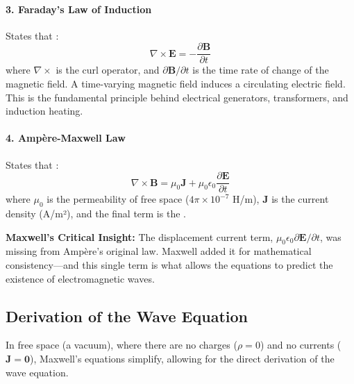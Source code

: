 \paragraph{3. Faraday's Law of Induction}
States that :
\begin{equation}
    \nabla \times \mathbf{E} = -\frac{\partial \mathbf{B}}{\partial t}
    \label{eq:faraday}
\end{equation}
where $\nabla \times$ is the curl operator, and $\partial \mathbf{B}/\partial t$ is the time rate of change of the magnetic field.
 A time-varying magnetic field induces a circulating electric field. This is the fundamental principle behind electrical generators, transformers, and induction heating.

\paragraph{4. Ampère-Maxwell Law}
States that :
\begin{equation}
    \nabla \times \mathbf{B} = \mu_0 \mathbf{J} + \mu_0 \epsilon_0 \frac{\partial \mathbf{E}}{\partial t}
    \label{eq:ampere-maxwell}
\end{equation}
where $\mu_0$ is the permeability of free space ($4\pi \times 10^{-7}$ H/m), $\mathbf{J}$ is the current density (A/m²), and the final term is the .

\begin{keyconcept}
    \textbf{Maxwell's Critical Insight:} The displacement current term, $\mu_0 \epsilon_0 \partial \mathbf{E}/\partial t$, was missing from Ampère's original law. Maxwell added it for mathematical consistency—and this single term is what allows the equations to predict the existence of electromagnetic waves.
\end{keyconcept}

\subsection{Derivation of the Wave Equation}

In free space (a vacuum), where there are no charges ($\rho = 0$) and no currents ($\mathbf{J} = \mathbf{0}$), Maxwell's equations simplify, allowing for the direct derivation of the wave equation.

